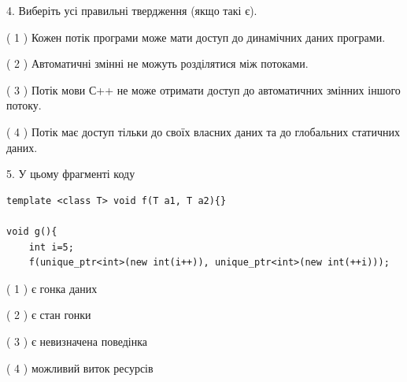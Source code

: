 \documentclass[12pt, ukrainian]{article}
\begin{document}
\begin {large}
{%
4. Виберіть усі правильні твердження (якщо такі є).\par
\vspace{2mm}

( 1 ) Кожен потік програми може мати доступ до динамічних даних програми.%

( 2 ) Автоматичні змінні не можуть розділятися між потоками.%

( 3 ) Потік мови С++ не може отримати доступ до автоматичних змінних іншого потоку.%

( 4 ) Потік має доступ тільки до своїх власних даних та до глобальних статичних даних.%


5. У цьому фрагменті коду
\begin{verbatim}
template <class T> void f(T a1, T a2){}

void g(){
    int i=5;
    f(unique_ptr<int>(new int(i++)), unique_ptr<int>(new int(++i)));
\end{verbatim}

( 1 ) є гонка даних%

( 2 ) є стан гонки%

( 3 ) є невизначена поведінка%

( 4 ) можливий виток ресурсів%
}
\end {large}
\end{document}
